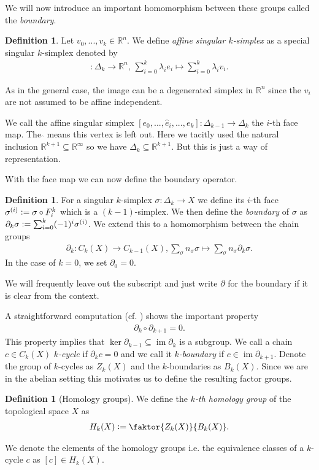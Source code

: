 \documentclass[12pt,a4paper]{article}
\numberwithin{equation}{subsection}
\numberwithin{lemma}{subsection}
\theoremstyle{definition}
\newtheorem{definition}[lemma]{Definition}
\DeclareMathOperator{\Ima}{im}
\newcommand{\real}{\mathbb{R}}
\begin{document}
We will now introduce an important homomorphism between these groups called the \textit{boundary}.
\begin{definition}
    Let $v_0, ... , v_k \in \real^n$. 
    We define \textit{affine singular $k$-simplex} as a special singular $k$-simplex denoted by
    \begin{align*}
        [v_0,...,v_k]: \Delta_k \rightarrow \real^n, \, 
        \sum\limits_{i = 0}^k \lambda_i e_i \mapsto \sum\limits_{i = 0}^k \lambda_i v_i.
    \end{align*}
\end{definition}
As in the general case, the image can be a degenerated simplex in $\real^n$ since the 
$v_i$ are not assumed to be affine independent. 

We call the affine singular simplex 
$[e_0,...,\hat{e}_i,...,e_k]: \Delta_{k-1} \rightarrow \Delta_k$ the $i$-th face map. 
The $\hat{ }$ means this vertex is left out. Here we tacitly used the 
natural inclusion $\real^{k+1} \subseteq \real^\infty$ so we have 
$\Delta_k \subseteq \real^{k+1}$. But this is just a way of representation.

With the face map we can now define the boundary operator.
\begin{definition}
    For a singular $k$-simplex $\sigma: \Delta_k \rightarrow X$ we define its $i$-th face 
    $\sigma^{(i)} \vcentcolon= \sigma \circ F_i^k$ which is a $(k-1)$-simplex. 
    We then define the \textit{boundary} of $\sigma$ as 
    $\partial_k \sigma \vcentcolon= \sum_{i=0}^k (-1)^i \sigma^{(i)}$. We extend this 
    to a homomorphism between the chain groups
    \begin{align*}
        \partial_k: C_k(X) \rightarrow C_{k-1}(X), 
        \sum_\sigma n_\sigma \sigma \mapsto \sum_\sigma n_\sigma \partial_k \sigma.
    \end{align*}
    In the case of $k=0$, we set $\partial_0 = 0$.
\end{definition}
We will frequently leave out the subscript and just write $\partial$ for the boundary 
if it is clear from the context.

A straightforward computation (cf. \cite[Lemma 1.6]{topology_and_geometry}) shows the 
important property 
\begin{align*}
    \partial_k \circ \partial_{k+1} = 0.
\end{align*}
This property implies that $\ker \partial_{k-1} \subseteq \Ima \partial_k$ is 
a subgroup. We call a chain $c \in C_k(X)$ \textit{$k$-cycle} if $\partial_k c = 0$ and 
we call it \textit{$k$-boundary} if $c \in \Ima \partial_{k+1}$. 
Denote the group of $k$-cycles as $Z_k(X)$ and the $k$-boundaries as $B_k(X)$.
Since we are in the abelian setting this motivates us to define 
the resulting factor groups.
\begin{definition}[Homology groups]
    We define the \textit{$k$-th homology group} of the topological space $X$ as
    \begin{align*}
        H_k(X) \vcentcolon= \faktor{Z_k(X)}{B_k(X)}.
    \end{align*} 
\end{definition}
We denote the elements of the homology groups i.e. the equivalence classes of a 
$k$-cycle $c$ as $[c] \in H_k(X)$.
\end{document}
